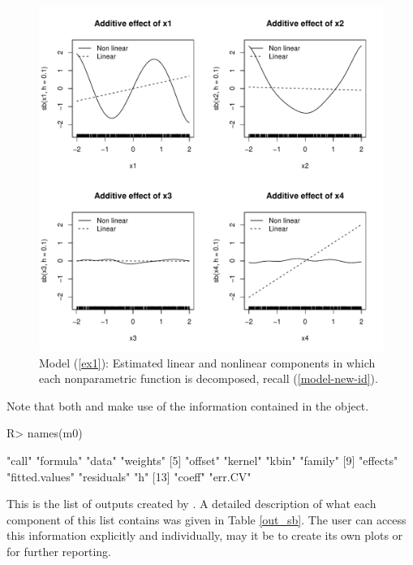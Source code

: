 \begin{figure}[htb]
	 \vspace{-0.5cm}
\centering 
\includegraphics[width=14cm]{Gaussian_Plot_2.pdf}   \vspace{-0.75cm}
\caption{Model (\ref{ex1}): Estimated linear and nonlinear components in which each nonparametric function is decomposed, recall (\ref{model-new-id}).
\label{fig-simul-2}  }
\end{figure}

Note that both  and  make use of the information contained in the   object.
\begin{Schunk}
\begin{Sinput}
R> names(m0)
\end{Sinput}
\begin{Soutput}
 [1] "call"          "formula"       "data"          "weights"      
 [5] "offset"        "kernel"        "kbin"          "family"       
 [9] "effects"       "fitted.values" "residuals"     "h"            
[13] "coeff"         "err.CV"
\end{Soutput}
\end{Schunk}
This is the list of outputs created by .
A detailed description of what each component of this list contains was given in Table \ref{out_sb}. 
The user can access this information explicitly and individually, may it be to create its own plots or for further reporting.


